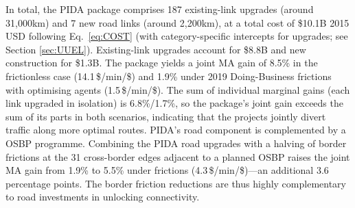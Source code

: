 \documentclass[a4paper]{article}
\begin{document}
In total, the PIDA package comprises 187 existing-link upgrades (around 31,000km) and 7 new road links (around 2,200km), at a total cost of \$10.1B 2015 USD following Eq.\ \ref{eq:COST} (with category-specific intercepts for upgrades; see Section \ref{sec:UUEL}). Existing-link upgrades account for \$8.8B and new construction for \$1.3B. The package yields a joint MA gain of 8.5\% in the frictionless case (14.1\,\$/min/\$) and 1.9\% under 2019 Doing-Business frictions with optimising agents (1.5\,\$/min/\$). The sum of individual marginal gains (each link upgraded in isolation) is 6.8\%/1.7\%, so the package's joint gain exceeds the sum of its parts in both scenarios, indicating that the projects jointly divert traffic along more optimal routes. PIDA's road component is complemented by a OSBP programme. %
Combining the PIDA road upgrades with a halving of border frictions at the 31 cross-border edges adjacent to a planned OSBP raises the joint MA gain from 1.9\% to 5.5\% under frictions (4.3\,\$/min/\$)---an additional 3.6 percentage points. The border friction reductions are thus highly complementary to road investments in unlocking connectivity. \newline
\end{document}
